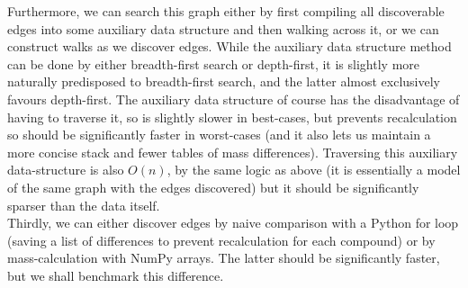 \documentclass{article}
\begin{document}
Furthermore, we can search this graph either by first compiling all discoverable edges into some auxiliary data structure and then walking across it,
or we can construct walks as we discover edges.
While the auxiliary data structure method can be done by either breadth-first search or depth-first, it is slightly more naturally predisposed to breadth-first search,
and the latter almost exclusively favours depth-first.
The auxiliary data structure of course has the disadvantage of having to traverse it, so is slightly slower in best-cases, but prevents recalculation so should be
significantly faster in worst-cases (and it also lets us maintain a more concise stack and fewer tables of mass differences).
Traversing this auxiliary data-structure is also \(O(n)\), by the same logic as above (it is essentially a model of the same graph with the edges discovered)
but it should be significantly sparser than the data itself. \\

Thirdly, we can either discover edges by naive comparison with a Python for loop (saving a list of differences to prevent recalculation for each compound)
or by mass-calculation with NumPy arrays.
The latter should be significantly faster, but we shall benchmark this difference. \\
\end{document}
